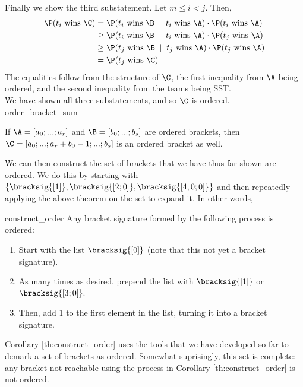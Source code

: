 {{Finally we show the third substatement. Let $m \leq i < j.$ Then,
\begin{align*}
    \P(t_i \textrm{ wins }\C) &= \P(t_i \textrm{ wins }\B \;\mid\; t_i \textrm{ wins } \A)\cdot \P(t_i \textrm{ wins } \A)\\
    &\geq \P(t_i \textrm{ wins }\B \;\mid\; t_i \textrm{ wins } \A)\cdot \P(t_j \textrm{ wins } \A)\\
    &\geq \P(t_j \textrm{ wins }\B \;\mid\; t_j \textrm{ wins } \A)\cdot \P(t_j \textrm{ wins } \A)\\
    &= \P(t_j \textrm{ wins }\C)
\end{align*}
The equalities follow from the structure of $\C$, the first inequality from $\A$ being ordered, and the second inequality from the teams being SST.\\

We have shown all three substatements, and so $\C$ is ordered.
}{order_bracket_sum}

\begin{corollary}{}{}
    If $\A = [a_0; ...; a_r]$ and $\B = [b_0; ...; b_s]$ are ordered brackets, then $\C = [a_0; ...; a_r + b_0 - 1; ...; b_s]$ is an ordered bracket as well.
\end{corollary}

We can then construct the set of brackets that we have thus far shown are ordered. We do this by starting with $\{\bracksig{[1]}, \bracksig{[2; 0]}, \bracksig{[4; 0; 0]}\}$ and then repeatedly applying the above theorem on the set to expand it. In other words,

\begin{corollary}{}{construct_order}
    Any bracket signature formed by the following process is ordered:
    \begin{enumerate}
        \item Start with the list $\bracksig{[0]}$ (note that this not yet a bracket signature).
        \item As many times as desired, prepend the list with $\bracksig{[1]}$ or $\bracksig{[3; 0]}.$
        \item Then, add 1 to the first element in the list, turning it into a bracket signature.
    \end{enumerate}
\end{corollary}

Corollary \ref{th:construct_order} uses the tools that we have developed so far to demark a set of brackets as ordered. Somewhat suprisingly, this set is complete: any bracket not reachable using the process in Corollary \ref{th:construct_order} is not ordered.

}
